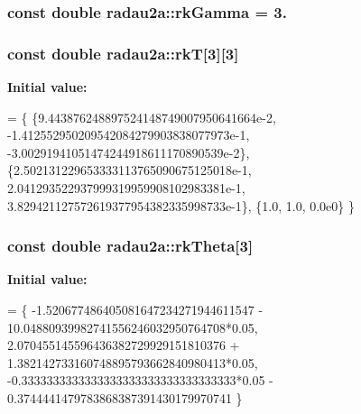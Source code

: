 \subsubsection[{\texorpdfstring{rk\+Gamma}{rkGamma}}]{\setlength{\rightskip}{0pt plus 5cm}const double radau2a\+::rk\+Gamma = 3.\hspace{0.3cm}{\ttfamily [static]}}\hypertarget{group__RK__Params_ga188fa0b309eb2826403d911684735824}{}\label{group__RK__Params_ga188fa0b309eb2826403d911684735824}
\subsubsection[{\texorpdfstring{rkT}{rkT}}]{\setlength{\rightskip}{0pt plus 5cm}const double radau2a\+::rkT\mbox{[}3\mbox{]}\mbox{[}3\mbox{]}\hspace{0.3cm}{\ttfamily [static]}}\hypertarget{group__RK__Params_gac217dadb5a83f73958dba436ae4fa415}{}\label{group__RK__Params_gac217dadb5a83f73958dba436ae4fa415}
{\bfseries Initial value\+:}
\begin{DoxyCode}
= \{
\{9.443876248897524148749007950641664e-2,
-1.412552950209542084279903838077973e-1,
-3.00291941051474244918611170890539e-2\},
\{2.502131229653333113765090675125018e-1,
2.041293522937999319959908102983381e-1,
3.829421127572619377954382335998733e-1\},
\{1.0,
1.0,
0.0e0\}
\}
\end{DoxyCode}
\subsubsection[{\texorpdfstring{rk\+Theta}{rkTheta}}]{\setlength{\rightskip}{0pt plus 5cm}const double radau2a\+::rk\+Theta\mbox{[}3\mbox{]}\hspace{0.3cm}{\ttfamily [static]}}\hypertarget{group__RK__Params_ga905a164e07054850af60562b36b1aa9f}{}\label{group__RK__Params_ga905a164e07054850af60562b36b1aa9f}
{\bfseries Initial value\+:}
\begin{DoxyCode}
= \{
    -1.520677486405081647234271944611547 - 10.04880939982741556246032950764708*0.05,
    2.070455145596436382729929151810376 + 1.382142733160748895793662840980413*0.05,
    -0.3333333333333333333333333333333333*0.05 - 0.3744441479783868387391430179970741
    \}
\end{DoxyCode}
